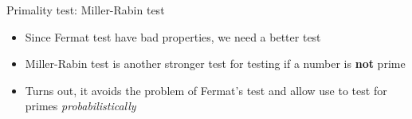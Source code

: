 \documentclass[10pt,xcolor={table,dvipsnames},t]{beamer}
\begin{document}
\begin{frame}{Primality test: Miller-Rabin test}
  \begin{itemize}
    \item Since Fermat test have bad properties, we need a better test
    \item Miller-Rabin test is another stronger test for testing if a number is \textbf{not} prime
    \item Turns out, it avoids the problem of Fermat's test and allow use to test for primes \textit{probabilistically}
  \end{itemize}
\end{frame}
\end{document}
